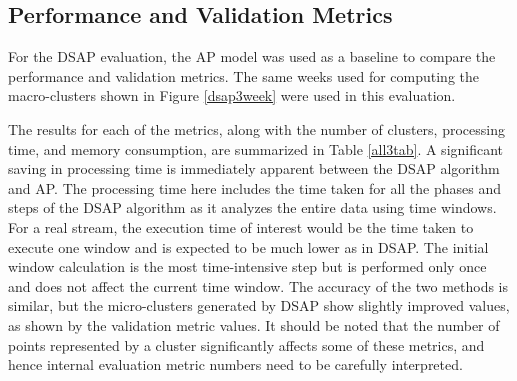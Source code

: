 


\subsection{Performance and Validation Metrics}

For the DSAP evaluation, the AP model was used as a baseline to compare the performance and validation metrics. The same weeks used for computing the macro-clusters shown in Figure \ref{dsap3week} were used in this evaluation.








The results for each of the metrics, along with the number of clusters, processing time, and memory consumption, are summarized in Table \ref{all3tab}. A significant saving in processing time is immediately apparent between the DSAP algorithm and AP. The processing time here includes the time taken for all the phases and steps of the DSAP algorithm as it analyzes the entire data using time windows. For a real stream, the execution time of interest would be the time taken to execute one window and is expected to be much lower as in DSAP. The initial window calculation is the most time-intensive step but is performed only once and does not affect the current time window. The accuracy of the two methods is similar, but the micro-clusters generated by DSAP show slightly improved values, as shown by the validation metric values. It should be noted that the number of points represented by a cluster significantly affects some of these metrics, and hence internal evaluation metric numbers need to be carefully interpreted.


